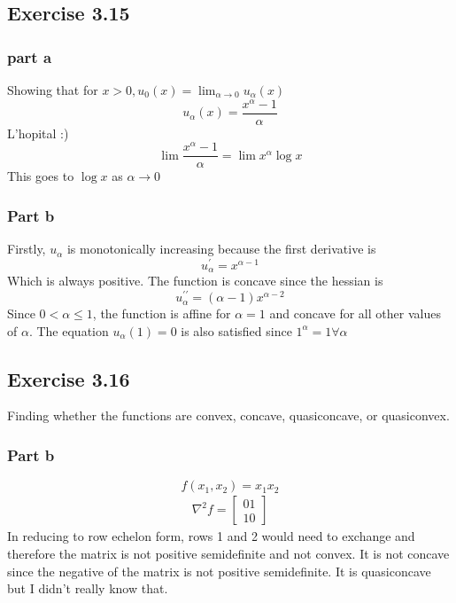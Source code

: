 \subsection{Exercise 3.15}
\subsubsection{part a}
Showing that for $x > 0,  u_0(x) = \lim_{\alpha \to 0} u_\alpha (x)$
\begin{equation}
  u_\alpha(x) = \frac{x^\alpha-1}{\alpha}
\end{equation}
L'hopital :)
\begin{equation}
  \lim \frac{x^\alpha-1}{\alpha} = \lim x^\alpha \log x
\end{equation}
This goes to $\log x$ as $\alpha \to 0$
\subsubsection{Part b}
Firstly, $u_\alpha$ is monotonically increasing because the first derivative is
\begin{equation}
  u_\alpha^{\prime} = x^{\alpha-1} 
\end{equation}
Which is always positive. The function is concave since the hessian is 
\begin{equation}
  u_\alpha^{\prime \prime} = (\alpha-1)x^{\alpha-2} 
\end{equation}
Since $0 < \alpha \leq 1$, the function is affine for $\alpha=1$ and concave for all other values of $\alpha$. The equation $u_\alpha(1) = 0 $ is also satisfied since $1^\alpha=1 \forall \alpha$  

\subsection{Exercise 3.16}
Finding whether the functions are convex, concave, quasiconcave, or quasiconvex.

\subsubsection{Part b}
  
\begin{equation}
  f(x_1,x_2)= x_1x_2
\end{equation}
\begin{align}
  \nabla^2 f = 
  \begin{bmatrix}
     0 1 \\
     1 0
  \end{bmatrix}
\end{align}
In reducing to row echelon form, rows 1 and 2 would need to exchange and therefore the matrix is not positive semidefinite and not convex. It is not concave since the negative of the matrix is not positive semidefinite. It is quasiconcave but I didn't really know that.

